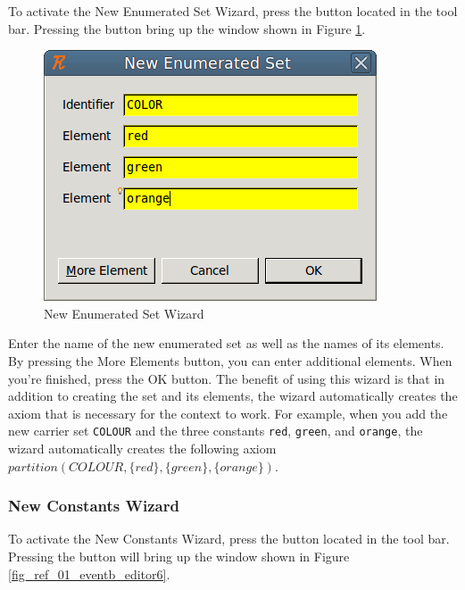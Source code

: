 To activate the \textsf{New Enumerated Set Wizard}, press the  button located in the tool bar. Pressing the button bring up the window shown in Figure \ref{fig_ref_01_eventb_editor5}.

\begin{figure}[!ht]
\begin{center}
	\includegraphics{img/reference/ref_01_eventb_editor5.png}
	\caption{New Enumerated Set Wizard}
	\label{fig_ref_01_eventb_editor5}
\end{center}
\end{figure}

Enter the name of the new enumerated set as well as the names of its elements. By pressing the \textsf{More Elements} button, you can enter additional elements. When you're finished, press the \textsf{OK} button. The benefit of using this wizard is that in addition to creating the set and its elements, the wizard automatically creates the axiom that is necessary for the context to work. For example, when you add the new carrier set \texttt{COLOUR} and the three constants \texttt{red}, \texttt{green}, and \texttt{orange}, the wizard automatically creates the following axiom $partition(COLOUR , \{red\}, \{green\}, \{orange\})$.

\subsubsection{New Constants Wizard}

To activate the \textsf{New Constants Wizard}, press the  button located in the tool bar. Pressing the button will bring up the window shown in Figure \ref{fig_ref_01_eventb_editor6}.

